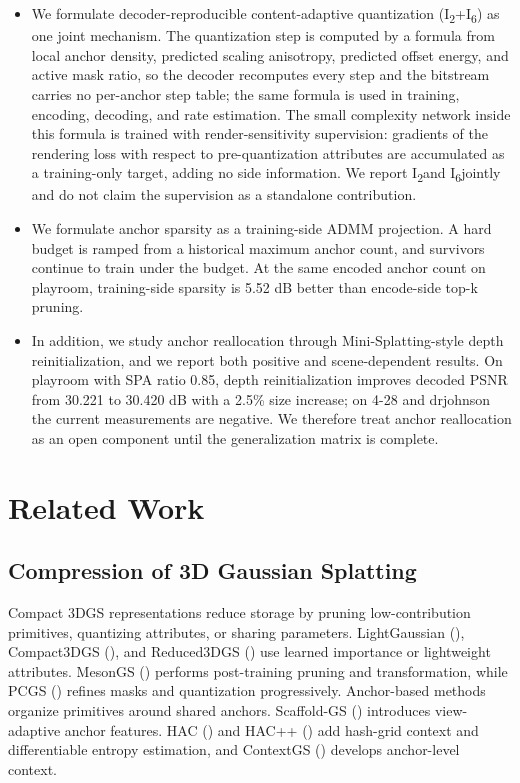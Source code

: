 \documentclass{article}
\newcommand{\Itwo}{I\textsubscript{2}}
\newcommand{\Isix}{I\textsubscript{6}}
\begin{document}
\begin{itemize}
\item We formulate decoder-reproducible content-adaptive quantization (\Itwo+\Isix) as one joint mechanism. The quantization step is computed by a formula from local anchor density, predicted scaling anisotropy, predicted offset energy, and active mask ratio, so the decoder recomputes every step and the bitstream carries no per-anchor step table; the same formula is used in training, encoding, decoding, and rate estimation. The small complexity network inside this formula is trained with render-sensitivity supervision: gradients of the rendering loss with respect to pre-quantization attributes are accumulated as a training-only target, adding no side information. We report \Itwo and \Isix jointly and do not claim the supervision as a standalone contribution.
\item We formulate anchor sparsity as a training-side ADMM projection. A hard budget is ramped from a historical maximum anchor count, and survivors continue to train under the budget. At the same encoded anchor count on playroom, training-side sparsity is 5.52 dB better than encode-side top-k pruning.
\item In addition, we study anchor reallocation through Mini-Splatting-style depth reinitialization, and we report both positive and scene-dependent results. On playroom with SPA ratio 0.85, depth reinitialization improves decoded PSNR from 30.221 to 30.420 dB with a 2.5\% size increase; on 4-28 and drjohnson the current measurements are negative. We therefore treat anchor reallocation as an open component until the generalization matrix is complete.
\end{itemize}

\section{Related Work}

\subsection{Compression of 3D Gaussian Splatting}
Compact 3DGS representations reduce storage by pruning low-contribution primitives, quantizing attributes, or sharing parameters. LightGaussian (\citet{fan2024}), Compact3DGS (\citet{lee2024}), and Reduced3DGS (\citet{papantonakis2024}) use learned importance or lightweight attributes. MesonGS (\citet{xie2024}) performs post-training pruning and transformation, while PCGS (\citet{chen2026a}) refines masks and quantization progressively. Anchor-based methods organize primitives around shared anchors. Scaffold-GS (\citet{lu2024}) introduces view-adaptive anchor features. HAC (\citet{chen2024}) and HAC++ (\citet{chen2025}) add hash-grid context and differentiable entropy estimation, and ContextGS (\citet{wang2024b}) develops anchor-level context.
\end{document}
